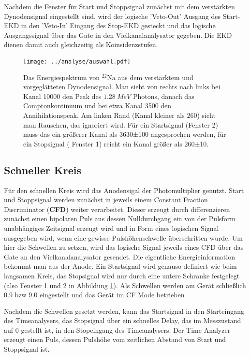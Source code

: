 \documentclass[a4paper,12pt]{article}
\begin{document}
Nachdem die Fenster für Start und Stoppsignal zunächst mit dem verstärkten Dynodensignal eingestellt sind,
wird der logische 'Veto-Out' Ausgang des Start-EKD in den 'Veto-In' Eingang des Stop-EKD gesteckt und das logische Ausgangssignal über das Gate
in den Vielkanalanalysator gegeben.
Die EKD dienen damit auch gleichzeitig als Koinsidenzstufen.

\begin{figure}
	\centering
	\texttt{[image: ../analyse/auswahl.pdf]}
	\caption{Das Energiespektrum von $^{22}$Na aus dem verstärktem und vorgeglätteten
		Dynodensignal.
		Man sieht von rechts nach links bei Kanal 10000 den Peak des $\SI{1.28}{MeV}$ Photons,
		danach das Comptonkontinuum und bei etwa Kanal 3500 den Annihilationspeak.
		Am linken Rand (Kanal kleiner als 260) sieht man Rauschen, das ignoriert wird.
		Für ein Startsignal (Fenster 2) muss das ein größerer Kanal als 3630±100 angesprochen werden, 
		für ein Stopsignal ( Fenster 1) reicht ein Kanal größer als 260±10.}
	\label{fig:auswahl}
\end{figure}


\subsection*{Schneller Kreis}
Für den schnellen Kreis wird das Anodensigal der Photomultiplier genutzt.
Start und Stoppsignal werden zunächst in jeweils einem Constant
Fraction Discriminator (\textbf{CFD}) weiter verarbeitet.
Dieser erzeugt durch differenzieren zunächst einen bipolaren Puls aus dessen Nulldurchgang ein von der Pulsform unabhängiges Zeitsignal erzeugt wird
und in Form eines logischen Signal ausgegeben wird, wenn eine gewisse Pulshöhenschwelle überschritten wurde.
Um hier die Schwellen zu setzen, wird das logische Signal jeweils eines CFD über das Gate an den Vielkanalanalysator gesendet.
Die eigentliche Energieinformation bekommt man aus der Anode.
Ein Startsignal wird genauso definiert wie beim langsamen Kreis, das Stopsignal wird nur durch eine untere Schranke festgelegt (also Fenster 1 und 2 in Abbildung \ref{fig:auswahl}).
Als Schwellen werden am Gerät schließlich 0.9 bzw 9.0 eingestellt und das Gerät im CF Mode betrieben

Nachdem die Schwellen gesetzt werden, kann das Startsignal in den Starteingang des Timeanalysers, das Stopsignal über ein schnelles Delay, das im Messzustand auf 0 gestellt ist, in den Stopeingang des Timeanalysers.
Der Time Analyzer erzeugt einen Puls, dessen Pulshöhe vom zeitlichen Abstand von Start und Stoppsignal ist.
\end{document}
